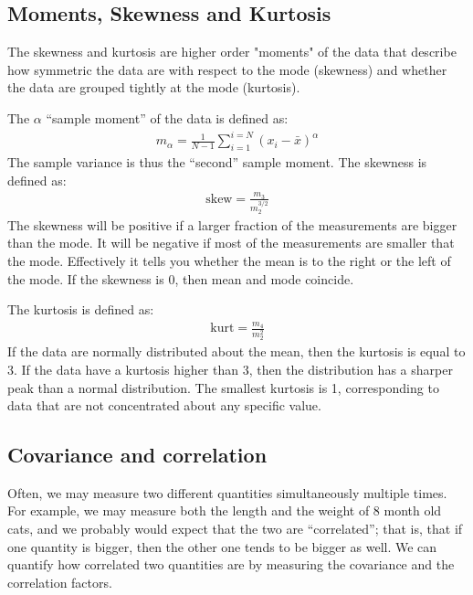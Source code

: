 \subsection{Moments, Skewness and Kurtosis}

The skewness and kurtosis are higher order "moments" of the data that describe how symmetric the data are with respect to the mode (skewness) and whether the data are grouped tightly at the mode (kurtosis).

The $\alpha$ ``sample moment'' of the data is defined as:
\begin{align}
 m_\alpha=\frac{1}{N-1} \sum_{i=1}^{i=N} (x_i-\bar{x})^\alpha 
\end{align}
The sample variance is thus the ``second'' sample moment. The skewness is defined as:
\begin{align}
 \text{skew} = \frac{m_3}{m_2^{3/2}} 
\end{align}
The skewness will be positive if a larger fraction of the measurements are bigger than the mode. It will be negative if most of the measurements are smaller that the mode. Effectively it tells you whether the mean is to the right or the left of the mode. If the skewness is 0, then mean and mode coincide.

The kurtosis is defined as:
\begin{align}
  \text{kurt}  =\frac{m_4}{m_2^{2}} 
\end{align}
If the data are normally distributed about the mean, then the kurtosis is equal to 3. If the data have a kurtosis higher than 3, then the distribution has a sharper peak than a normal distribution. The smallest kurtosis is 1, corresponding to data that are not concentrated about any specific value.

\subsection{Covariance and correlation}
Often, we may measure two different quantities simultaneously multiple times. For example, we may measure both the length and the weight of 8 month old cats, and we probably would expect that the two are ``correlated''; that is, that if one quantity is bigger, then the other one tends to be bigger as well. We can quantify how correlated two quantities are by measuring the covariance and the correlation factors. 

